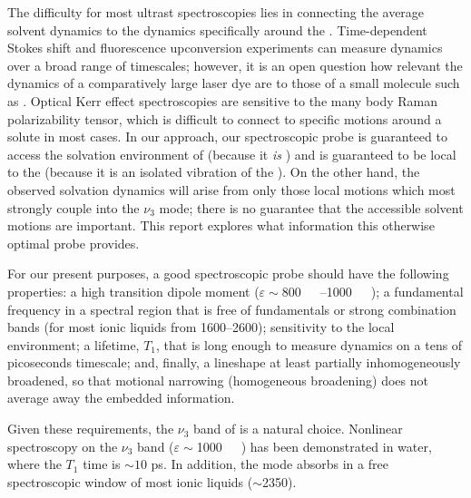 The difficulty for most ultrast spectroscopies lies in connecting the average solvent dynamics to the dynamics specifically around the . Time-dependent Stokes shift and fluorescence upconversion experiments\cite{zhangJPCB-12} can measure dynamics over a broad range of timescales; however, it is an open question how relevant the dynamics of a comparatively large laser dye are to those of a small molecule such as . Optical Kerr effect spectroscopies\cite{turtonJACS-09,castnerACR-07} are sensitive to the many body Raman polarizability tensor, which is difficult to connect to specific motions around a solute in most cases. In our approach, 
our spectroscopic probe is guaranteed to access the solvation environment of  (because it \textit{is} ) and is guaranteed to be local to the  (because it is an isolated vibration of the ). On the other hand, the observed solvation dynamics will arise from only those local motions which most strongly couple into the $\nu_3$ mode; there is no guarantee that the accessible solvent motions are important. This report explores what information this otherwise optimal probe provides.

For our present purposes, a good spectroscopic probe should have the following properties: 
a high transition dipole moment ($\varepsilon\sim$\SIrange[range-units = single]{800}{1000}{\per\Molar\wavenumber}); a fundamental frequency in a spectral region that is free of fundamentals or strong combination bands (for most ionic liquids from \SIrange[range-units = single]{1600}{2600}{\wavenumber}); sensitivity to the local environment; a lifetime, $T_1$, that is long enough to measure dynamics on a tens of picoseconds timescale; and, finally, a lineshape at least partially inhomogeneously broadened, so that motional narrowing (homogeneous broadening) does not average away the embedded information. 

Given these requirements, the $\nu_3$ band of  is a natural choice. Nonlinear spectroscopy on the $\nu_3$ band ($\varepsilon\sim$\SI{1000}{\per\Molar\wavenumber}) has been demonstrated in water,~\cite{Hamm1998,Garrett-Roe2009a} where the $T_1$ time is $\sim10$ ps. In addition, the mode absorbs in a free spectroscopic window of most ionic liquids ($\sim$\SI{2350}{\wavenumber}).

